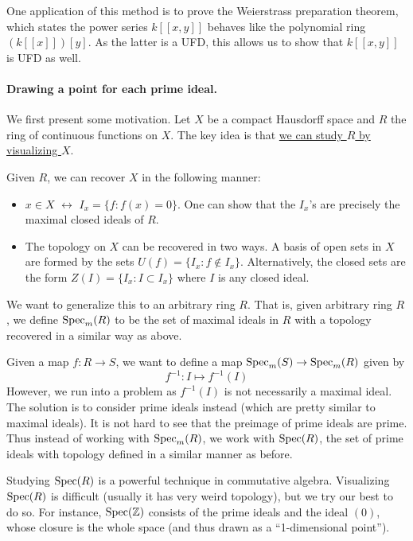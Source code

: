 One application of this method is to prove the Weierstrass preparation theorem, which states the power series $k[[x,y]]$ behaves like the polynomial ring $(k[[x]])[y]$. As the latter is a UFD, this allows us to show that $k[[x,y]]$ is UFD as well.

\paragraph{Drawing a point for each prime ideal.} We first present some motivation. Let $X$ be a compact Hausdorff space and $R$ the ring of continuous functions on $X$. The key idea is that \underline{we can study $R$ by visualizing $X$}.

Given $R$, we can recover $X$ in the following manner:
\begin{itemize}
    \item $x \in X$ $\longleftrightarrow$ $I_x = \{f : f(x) = 0\}$. One can show that the $I_x$'s are precisely the maximal closed ideals of $R$.
    \item The topology on $X$ can be recovered in two ways. A basis of open sets in $X$ are formed by the sets $U(f) = \{I_x : f \not \in I_x\}$. Alternatively, the closed sets are the form $Z(I) = \{I_x : I \subset I_x\}$ where $I$ is any closed ideal.
\end{itemize}
We want to generalize this to an arbitrary ring $R$. That is, given arbitrary ring $R$, we define $\operatorname{Spec}_m(R)$ to be the set of maximal ideals in $R$ with a topology recovered in a similar way as above.

Given a map $f: R \to S$, we want to define a map $\operatorname{Spec}_m(S) \to \operatorname{Spec}_m(R)$ given by
\[
    f^{-1}: I \mapsto f^{-1}(I)
\]
However, we run into a problem as $f^{-1}(I)$ is not necessarily a maximal ideal. The solution is to consider prime ideals instead (which are pretty similar to maximal ideals). It is not hard to see that the preimage of prime ideals are prime. Thus instead of working with $\operatorname{Spec}_m(R)$, we work with $\operatorname{Spec}(R)$, the set of prime ideals with topology defined in a similar manner as before.

Studying $\operatorname{Spec}(R)$ is a powerful technique in commutative algebra. Visualizing $\operatorname{Spec}(R)$ is difficult (usually it has very weird topology), but we try our best to do so. For instance, $\operatorname{Spec}({\mathbb Z})$ consists of the prime ideals and the ideal $(0)$, whose closure is the whole space (and thus drawn as a ``1-dimensional point'').


